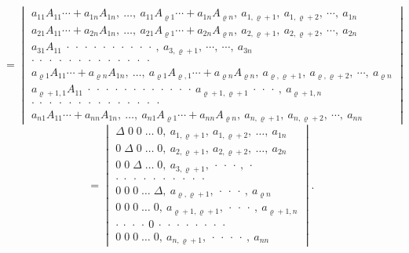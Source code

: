 \[
=
\begin{vmatrix}
a_{11}A_{11}\cdots+a_{1n}A_{1n},\ \ldots,\ a_{11}A_{\varrho1}\cdots+a_{1n}A_{\varrho n},\ a_{1,\varrho+1},\ a_{1,\varrho+2},\ \cdots,\ a_{1n} \\
a_{21}A_{11}\cdots+a_{2n}A_{1n},\ \ldots,\ a_{21}A_{\varrho1}\cdots+a_{2n}A_{\varrho n},\ a_{2,\varrho+1},\ a_{2,\varrho+2},\ \cdots,\ a_{2n} \\
a_{31}A_{11}\ \cdot\ \cdot\ \cdot\ \cdot\ \cdot\ \cdot\ \cdot\ \cdot\ \cdot\ \cdot\ ,\ a_{3,\varrho+1},\ \cdots,\ \cdots,\ a_{3n} \\
\cdot\;\cdot\;\cdot\;\cdot\;\cdot\;\cdot\;\cdot\;\cdot\;\cdot\;\cdot\;\cdot\;\cdot\;\cdot \\
a_{\varrho1}A_{11}\cdots+a_{\varrho n}A_{1n},\ \ldots,\ a_{\varrho1}A_{\varrho,1}\cdots+a_{\varrho n}A_{\varrho n},\ a_{\varrho,\varrho+1},\ a_{\varrho,\varrho+2},\ \cdots,\ a_{\varrho n} \\
a_{\varrho+1,1}A_{11}\ \cdot\ \cdot\ \cdot\ \cdot\ \cdot\ \cdot\ \cdot\ \cdot\ \cdot\ \cdot\ \cdot\ \cdot\ a_{\varrho+1,\varrho+1}\ \cdot\ \cdot\ \cdot\ ,\ a_{\varrho+1,n} \\
\cdot\;\cdot\;\cdot\;\cdot\;\cdot\;\cdot\;\cdot\;\cdot\;\cdot\;\cdot\;\cdot\;\cdot\;\cdot\;\cdot \\
a_{n1}A_{11}\cdots+a_{nn}A_{1n},\ \ldots,\ a_{n1}A_{\varrho1}\cdots+a_{nn}A_{\varrho n},\ a_{n,\varrho+1},\ a_{n,\varrho+2},\ \cdots,\ a_{nn}
\end{vmatrix}
\]
\[
=
\begin{vmatrix}
\Delta\;0\;0\;\ldots\;0,\ a_{1,\varrho+1},\ a_{1,\varrho+2},\ \ldots,\ a_{1n} \\
0\;\Delta\;0\;\ldots\;0,\ a_{2,\varrho+1},\ a_{2,\varrho+2},\ \ldots,\ a_{2n} \\
0\;0\;\Delta\;\ldots\;0,\ a_{3,\varrho+1},\ \cdot\ \cdot\ \cdot\ ,\ \cdot \\
\cdot\;\cdot\;\cdot\;\cdot\;\cdot\;\cdot\;\cdot\;\cdot\;\cdot\;\cdot \\
0\;0\;0\;\ldots\;\Delta,\ a_{\varrho,\varrho+1},\ \cdot\ \cdot\ \cdot\ ,\ a_{\varrho n} \\
0\;0\;0\;\ldots\;0,\ a_{\varrho+1,\varrho+1},\ \cdot\ \cdot\ \cdot\ ,\ a_{\varrho+1,n} \\
\cdot\ \cdot\ \cdot\ \cdot\ 0\ \cdot\ \cdot\ \cdot\ \cdot\ \cdot\ \cdot\ \cdot\ \cdot \\
0\;0\;0\;\ldots\;0,\ a_{n,\varrho+1},\ \cdot\ \cdot\ \cdot\ \cdot\ ,\ a_{nn}
\end{vmatrix}.
\]


